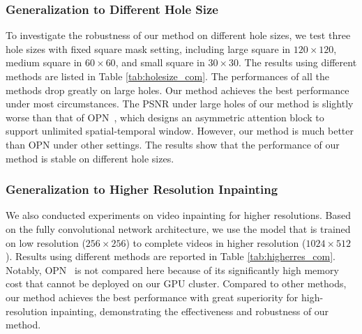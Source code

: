 \subsubsection{Generalization to Different Hole Size}
{\color{blue}	To investigate the robustness of our method on different hole sizes, we test three hole sizes with fixed square mask setting, including large square in $120\times120$, medium square in $60\times60$, and small square in $30\times30$. The results using different methods are listed in Table \ref{tab:holesize_com}. 
The performances of all the methods drop greatly on large holes. Our method achieves the best performance under most circumstances.
The PSNR under large holes of our method is slightly worse than that of OPN~\cite{oh2019onion}, which designs an asymmetric attention block to support unlimited spatial-temporal window. However, our method is much better than OPN under other settings. The results show that the performance of our method is stable on different hole sizes.

\subsubsection{Generalization to Higher Resolution Inpainting}
We also conducted experiments on video inpainting for higher resolutions. Based on the fully convolutional network architecture, we use the model that is trained on low resolution ($256\times256$) to complete videos in higher resolution ($1024\times512$). Results using different methods are reported in Table \ref{tab:higherres_com}. Notably, OPN~\cite{oh2019onion} is not compared here because of its significantly high memory cost that cannot be deployed on our GPU cluster. 
Compared to other methods, our method achieves the best performance with great superiority for high-resolution inpainting, demonstrating the effectiveness and robustness of our method.
}
 

